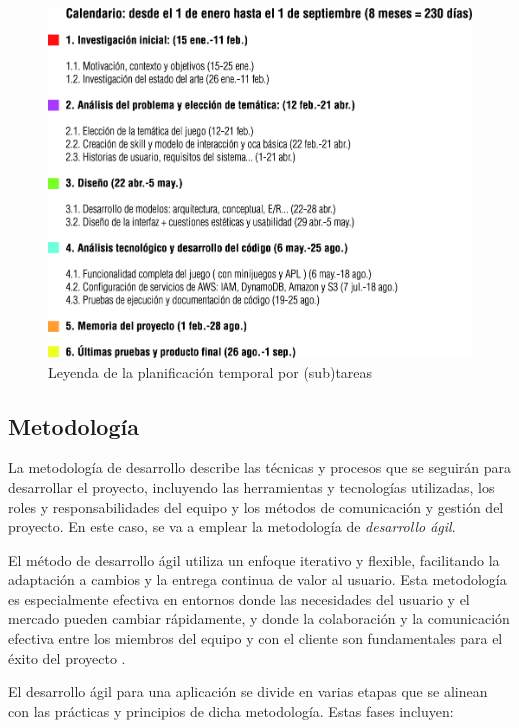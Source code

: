 \begin{figure}[H]
	\centering
	\includegraphics[width=1\textwidth]{imgs/tabla-planning2.jpg}
	\caption{Leyenda de la planificación temporal por (sub)tareas}
	\label{fig:planning2}
\end{figure}

\newpage

\subsection{Metodología}

La metodología de desarrollo describe las técnicas y procesos que se seguirán para desarrollar el proyecto, incluyendo las herramientas y tecnologías utilizadas, los roles y responsabilidades del equipo y los métodos de comunicación y gestión del proyecto. En este caso, se va a emplear la metodología de \textit{desarrollo ágil}.

El método de desarrollo ágil utiliza un enfoque iterativo y flexible, facilitando la adaptación a cambios y la entrega continua de valor al usuario. Esta metodología es especialmente efectiva en entornos donde las necesidades del usuario y el mercado pueden cambiar rápidamente, y donde la colaboración y la comunicación efectiva entre los miembros del equipo y con el cliente son fundamentales para el éxito del proyecto \parencite{metodologiaAgil}.

El desarrollo ágil para una aplicación se divide en varias etapas que se alinean con las prácticas y principios de dicha metodología. Estas fases incluyen:

